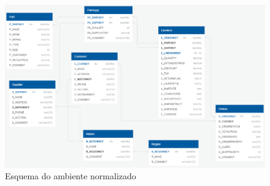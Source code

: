 \begin{figure}[h]
	\centering
		\includegraphics[width=\textwidth]{img/snow_flake.png}
	\caption{Esquema do ambiente normalizado}
	\label{fig:snow_flake}
\end{figure}

